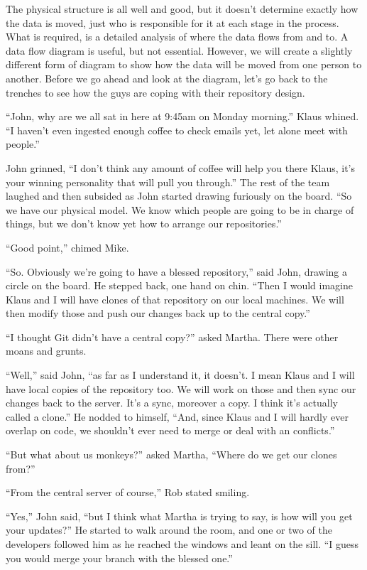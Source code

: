 The physical structure is all well and good, but it doesn't determine exactly how the data is moved, just who is responsible for it at each stage in the process.  What is required, is a detailed analysis of where the data flows from and to.  A data flow diagram is useful, but not essential.  However, we will create a slightly different form of diagram to show how the data will be moved from one person to another.  Before we go ahead and look at the diagram, let's go back to the trenches to see how the guys are coping with their repository design. 

\begin{trenches}
``John, why are we all sat in here at 9:45am on Monday morning.''  Klaus whined.  ``I haven't even ingested enough coffee to check emails yet, let alone meet with people.''

John grinned, ``I don't think any amount of coffee will help you there Klaus, it's your winning personality that will pull you through.''  The rest of the team laughed and then subsided as John started drawing furiously on the board.  ``So we have our physical model.  We know which people are going to be in charge of things, but we don't know yet how to arrange our repositories.''

``Good point,'' chimed Mike. 

``So.  Obviously we're going to have a blessed repository,'' said John, drawing a circle on the board.  He stepped back, one hand on chin.  ``Then I would imagine Klaus and I will have clones of that repository on our local machines.  We will then modify those and push our changes back up to the central copy.''

``I thought Git didn't have a central copy?'' asked Martha.  There were other moans and grunts. 

``Well,'' said John, ``as far as I understand it, it doesn't.  I mean Klaus and I will have local copies of the repository too.  We will work on those and then sync our changes back to the server.  It's a sync, moreover a copy.  I think it's actually called a clone.''  He nodded to himself, ``And, since Klaus and I will hardly ever overlap on code, we shouldn't ever need to merge or deal with an conflicts.''

``But what about us monkeys?'' asked Martha, ``Where do we get our clones from?''

``From the central server of course,'' Rob stated smiling. 

``Yes,'' John said, ``but I think what Martha is trying to say, is how will you get your updates?''  He started to walk around the room, and one or two of the developers followed him as he reached the windows and leant on the sill.  ``I guess you would merge your branch with the blessed one.''


\end{trenches}
